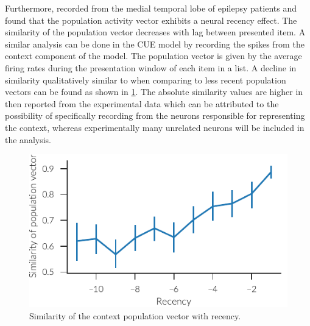 Furthermore, \textcite{folkerts2018} recorded from the medial temporal lobe of epilepsy patients and found that the population activity vector exhibits a neural recency effect.
The similarity of the population vector decreases with lag between presented item.
A similar analysis can be done in the CUE model by recording the spikes from the context component of the model.
The population vector is given by the average firing rates during the presentation window of each item in a list.
A decline in similarity qualitatively similar to \textcite{folkerts2018} when comparing to less recent population vectors can be found as shown in \cref{fig:popsim}.
The absolute similarity values are higher in then reported from the experimental data which can be attributed to the possibility of specifically recording from the neurons responsible for representing the context, whereas experimentally many unrelated neurons will be included in the analysis.
\begin{figure}
    \centering
    \includegraphics{figures/popsim}
    \caption{Similarity of the context population vector with recency.}\label{fig:popsim}
\end{figure}
